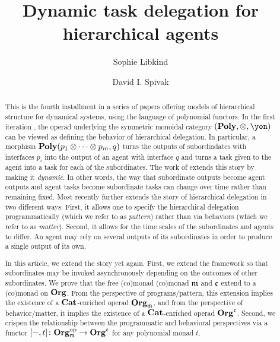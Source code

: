 \documentclass[11pt, one side, article]{memoir}
\begin{document}
\title{Dynamic task delegation for hierarchical agents}

\author{
	Sophie Libkind\and
	David I. Spivak
}


\maketitle

\begin{abstract}
This is the fourth installment in a series of papers offering models of hierarchical structure for dynamical systems, using the language of polynomial functors. In the first iteration  \cite{niu2022poly}, the operad underlying the symmetric monoidal category $(\poly, \otimes, \yon)$ can be viewed as defining the behavior of hierarchical delegation. In particular, a morphism $\mathbf{Poly}(p_1 \otimes \cdots \otimes p_m, q)$ turns the outputs of subordindates with interfaces $p_i$ into the output of an agent with interface $q$ and turns a task given to the agent into a task for each of the subordinates. The work of \cite{shapiro2022dynamic} extends this story by making it \emph{dynamic}. In other words, the way that subordinate outputs become agent outputs and agent tasks become subordinate tasks can change over time rather than remaining fixed. Most recently \cite{libkind2024pattern} further extends the story of hierarchical delegation in two different ways. First, it allows one to specify the hierarchical delegation programmatically (which we refer to as \emph{pattern}) rather than via behaviors (which we refer to as \emph{matter}).  Second, it allows for the time scales of the subordinates and agents to differ. An agent may rely on several outputs of its subordinates in order to produce a single output of its own.

In this article, we extend the story yet again. First, we extend the framework so that subordinates may be invoked asynchronously depending on the outcomes of other subordinates. We prove that the free (co)monad (co)monad $\mathfrak{m}$ and $\mathfrak{c}$ extend to a (co)monad on $\mathbf{Org}$. From the perspective of programs/pattern, this extension implies the existence of a $\mathbf{Cat}$-enriched operad $\mathbf{Org}_{\mathfrak{m}}$, and from the perspective of behavior/matter, it implies the existence of a $\mathbf{Cat}$-enriched operad $\mathbf{Org}^{\mathfrak{c}}$.  Second, we crispen the relationship between the programmatic and behavioral perspectives via a functor $[-, t] \colon \mathbf{Org}_{\mathfrak{m}}^{\textnormal{op}} \to \mathbf{Org}^{\mathfrak{c}}$ for any polynomial monad $t$.

\end{abstract}
\end{document}
